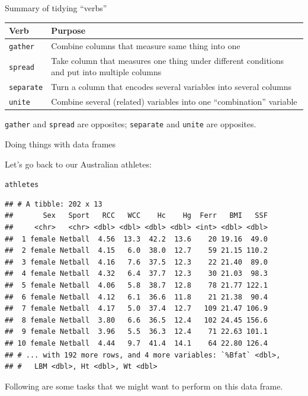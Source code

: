 \documentclass[unknownkeysallowed]{beamer}\usepackage[]{graphicx}\usepackage[]{color}
\makeatletter
\newcommand{\hlstd}[1]{\textcolor[rgb]{0.345,0.345,0.345}{#1}}%
\newenvironment{kframe}{%
 \def\at@end@of@kframe{}%
 \ifinner\ifhmode%
  \def\at@end@of@kframe{\end{minipage}}%
  \begin{minipage}{\columnwidth}%
 \fi\fi%
 \def\FrameCommand##1{\hskip\@totalleftmargin \hskip-\fboxsep
 \colorbox{shadecolor}{##1}\hskip-\fboxsep
     \hskip-\linewidth \hskip-\@totalleftmargin \hskip\columnwidth}%
 \MakeFramed {\advance\hsize-\width
   \@totalleftmargin\z@ \linewidth\hsize
   \@setminipage}}%
 {\par\unskip\endMakeFramed%
 \at@end@of@kframe}
\newenvironment{knitrout}{}{} %
\makeatother
\begin{document}
\begin{frame}[fragile]{Summary of tidying ``verbs''}
  
  \begin{tabular}{lp{}}
    Verb & Purpose\\
    \hline
    \texttt{gather}& Combine columns that measure same thing into one\\
    \texttt{spread}& Take column that measures one thing under
                     different conditions and put into multiple columns\\
    \texttt{separate} & Turn a column that encodes
                        several variables into
                        several columns\\
    \texttt{unite} & Combine several (related) variables into one
                     ``combination'' variable\\
    \hline
  \end{tabular}
  
  \texttt{gather} and \texttt{spread} are opposites; \texttt{separate}
  and \texttt{unite} are opposites.
\end{frame}

\begin{frame}[fragile]{Doing things with data frames}
  
  Let's go back to our Australian athletes:
  


\begin{knitrout}\footnotesize
{}\color{fgcolor}\begin{kframe}
\begin{alltt}
\hlstd{athletes}
\end{alltt}
\begin{verbatim}
## # A tibble: 202 x 13
##       Sex   Sport   RCC   WCC    Hc    Hg  Ferr   BMI   SSF
##     <chr>   <chr> <dbl> <dbl> <dbl> <dbl> <int> <dbl> <dbl>
##  1 female Netball  4.56  13.3  42.2  13.6    20 19.16  49.0
##  2 female Netball  4.15   6.0  38.0  12.7    59 21.15 110.2
##  3 female Netball  4.16   7.6  37.5  12.3    22 21.40  89.0
##  4 female Netball  4.32   6.4  37.7  12.3    30 21.03  98.3
##  5 female Netball  4.06   5.8  38.7  12.8    78 21.77 122.1
##  6 female Netball  4.12   6.1  36.6  11.8    21 21.38  90.4
##  7 female Netball  4.17   5.0  37.4  12.7   109 21.47 106.9
##  8 female Netball  3.80   6.6  36.5  12.4   102 24.45 156.6
##  9 female Netball  3.96   5.5  36.3  12.4    71 22.63 101.1
## 10 female Netball  4.44   9.7  41.4  14.1    64 22.80 126.4
## # ... with 192 more rows, and 4 more variables: `%Bfat` <dbl>,
## #   LBM <dbl>, Ht <dbl>, Wt <dbl>
\end{verbatim}
\end{kframe}
\end{knitrout}

Following are some tasks that we might want to perform on this data frame.
\end{frame}
\end{document}
